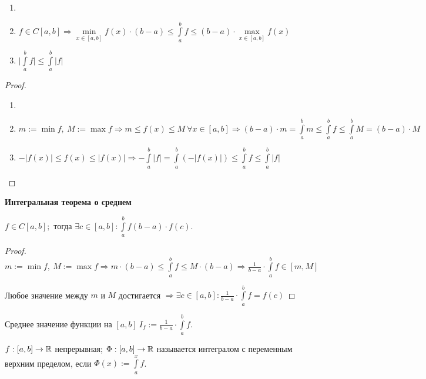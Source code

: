 \begin{corollary}
    \begin{enumerate}
        \item[]
        \item $f\in C[a,b]\Rightarrow \min\limits_{x\in[a,b]}f(x)\cdot (b-a) \leq \int\limits_a^b f \leq (b-a)\cdot \max\limits_{x\in[a,b]}f(x)$
        \item $\bigg|\int\limits_a^b f\bigg|\leq \int\limits_a^b |f|$
    \end{enumerate}
\end{corollary}

\begin{proof}
    \begin{enumerate}
        \item[]
        \item $m:=\min f,\ M:= \max f\Rightarrow m\leq f(x)\leq M\ \forall x\in [a,b]\Rightarrow (b-a)\cdot m = \int\limits_a^b m \leq \int\limits_a^b f \leq \int\limits_a^b M = (b-a)\cdot M$
        \item $-|f(x)|\leq f(x) \leq |f(x)|\Rightarrow -\int\limits_a^b |f|=\int\limits_a^b (-|f(x)|)\leq \int\limits_a^b f \leq \int\limits_a^b |f|$
    \end{enumerate}
\end{proof}

\begin{theorem} 
    \textbf{Интегральная теорема о среднем}

    $f\in C[a,b];$ тогда $\exists c\in [a,b]:\int\limits_a^b f(b-a)\cdot f(c)$.
\end{theorem}

\begin{proof}
    $m:=\min f,\ M:=\max f\Rightarrow m\cdot (b-a)\leq \int\limits_a^b f\leq M\cdot (b-a)\Rightarrow \frac{1}{b-a}\cdot \int\limits_a^b f\in [m,M]$

    Любое значение между $m$ и $M$ достигается $\Rightarrow \exists c\in [a,b]:\frac{1}{b-a}\cdot \int\limits_a^b f=f(c)$
\end{proof}

\begin{definition}
    Среднее значение функции на $[a,b]\ I_f:=\frac{1}{b-a}\cdot \int\limits_a^b f$.
\end{definition}

\begin{definition}
    $f:[a,b]\rightarrow \mathbb{R}$ непрерывная; $\Phi:[a,b]\rightarrow \mathbb{R}$ называется интегралом с переменным верхним пределом, если $\Phi(x):=\int\limits_a^x f$.
\end{definition}

